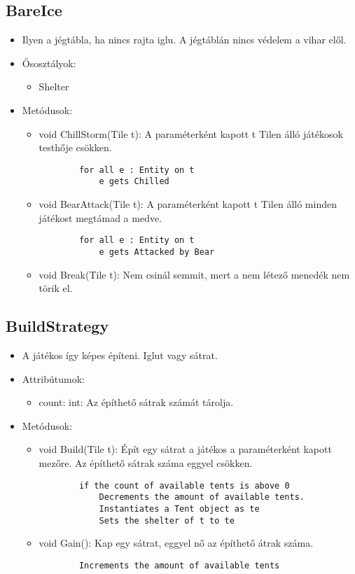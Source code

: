 \subsection{BareIce}
\begin{itemize}
	\item Ilyen a jégtábla, ha nincs rajta iglu. A jégtáblán nincs védelem a vihar elől.
	\item Ősosztályok:
	\begin{itemize}
		\item Shelter
	\end{itemize}
	\item Metódusok:
	\begin{itemize}
		\item void ChillStorm(Tile t): A paraméterként kapott t Tilen álló játékosok testhője csökken.
		\begin{lstlisting}
		for all e : Entity on t
			e gets Chilled
		\end{lstlisting}
		\item void BearAttack(Tile t): A paraméterként kapott t Tilen álló minden játékost megtámad a medve.
		\begin{lstlisting}
		for all e : Entity on t
			e gets Attacked by Bear
		\end{lstlisting}
		\item void Break(Tile t): Nem csinál semmit, mert a nem létező menedék nem törik el.
	\end{itemize}
\end{itemize}

\subsection{BuildStrategy}
\begin{itemize}
	\item A játékos így képes építeni. Iglut vagy sátrat.
	\item Attribútumok:
	\begin{itemize}
		\item count: int: Az építhető sátrak számát tárolja.
	\end{itemize}
	\item Metódusok:
	\begin{itemize}
		\item void Build(Tile t): Épít egy sátrat a játékos a paraméterként kapott mezőre. Az építhető sátrak száma eggyel csökken.
		\begin{lstlisting}
		if the count of available tents is above 0
			Decrements the amount of available tents.
			Instantiates a Tent object as te
			Sets the shelter of t to te
		\end{lstlisting}
		\item void Gain(): Kap egy sátrat, eggyel nő az építhető átrak száma.
		\begin{lstlisting}
		Increments the amount of available tents
		\end{lstlisting}
	
	\end{itemize}
\end{itemize}

